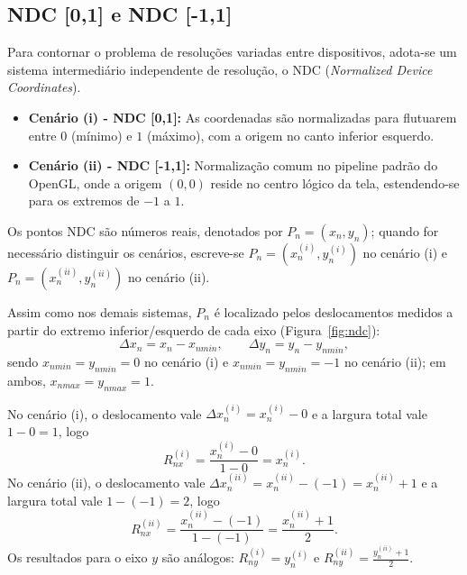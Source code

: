 \subsection{NDC [0,1] e NDC [-1,1]}
Para contornar o problema de resoluções variadas entre dispositivos, adota-se um sistema intermediário independente de resolução, o NDC (\textit{Normalized Device Coordinates}).
\begin{itemize}
    \item \textbf{Cenário (i) - NDC [0,1]:} As coordenadas são normalizadas para flutuarem entre $0$ (mínimo) e $1$ (máximo), com a origem no canto inferior esquerdo.
    \item \textbf{Cenário (ii) - NDC [-1,1]:} Normalização comum no pipeline padrão do OpenGL, onde a origem $(0,0)$ reside no centro lógico da tela, estendendo-se para os extremos de $-1$ a $1$.
\end{itemize}
Os pontos NDC são números reais, denotados por $P_n = (x_n, y_n)$; quando for necessário distinguir os cenários, escreve-se $P_n = (x_n^{(i)}, y_n^{(i)})$ no cenário (i) e $P_n = (x_n^{(ii)}, y_n^{(ii)})$ no cenário (ii).

Assim como nos demais sistemas, $P_n$ é localizado pelos deslocamentos medidos a partir do extremo inferior/esquerdo de cada eixo (Figura~\ref{fig:ndc}):
\begin{equation}
    \Delta x_n = x_n - x_{nmin}, \qquad \Delta y_n = y_n - y_{nmin},
\end{equation}
sendo $x_{nmin} = y_{nmin} = 0$ no cenário (i) e $x_{nmin} = y_{nmin} = -1$ no cenário (ii); em ambos, $x_{nmax} = y_{nmax} = 1$.

No cenário (i), o deslocamento vale $\Delta x_n^{(i)} = x_n^{(i)} - 0$ e a largura total vale $1 - 0 = 1$, logo
\begin{equation}
    R_{nx}^{(i)} = \frac{x_n^{(i)} - 0}{1 - 0} = x_n^{(i)}.
    \label{eq:razao-ndc01-x}
\end{equation}
No cenário (ii), o deslocamento vale $\Delta x_n^{(ii)} = x_n^{(ii)} - (-1) = x_n^{(ii)} + 1$ e a largura total vale $1 - (-1) = 2$, logo
\begin{equation}
    R_{nx}^{(ii)} = \frac{x_n^{(ii)} - (-1)}{1 - (-1)} = \frac{x_n^{(ii)} + 1}{2}.
    \label{eq:razao-ndc11-x}
\end{equation}
Os resultados para o eixo $y$ são análogos: $R_{ny}^{(i)} = y_n^{(i)}$ e $R_{ny}^{(ii)} = \frac{y_n^{(ii)} + 1}{2}$.

